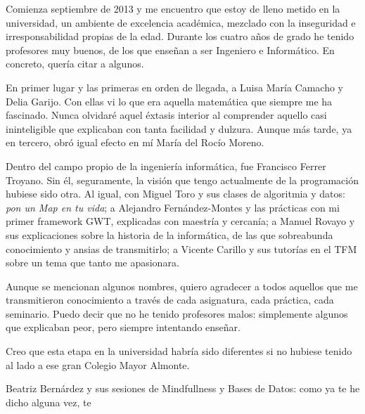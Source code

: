 Comienza septiembre de 2013 y me encuentro que estoy de lleno metido en la universidad, un ambiente de excelencia académica, mezclado con la inseguridad e irresponsabilidad propias de la edad. Durante los cuatro años de grado he tenido profesores muy buenos, de los que enseñan a ser Ingeniero e Informático. En concreto, quería citar a algunos.

En primer lugar y las primeras en orden de llegada, a Luisa María Camacho y Delia Garijo. Con ellas vi lo que era aquella matemática que siempre me ha fascinado. Nunca olvidaré aquel éxtasis interior al comprender aquello casi ininteligible que explicaban con tanta facilidad y dulzura. Aunque más tarde, ya en tercero, obró igual efecto en mí María del Rocío Moreno.

Dentro del campo propio de la ingeniería informática, fue Francisco Ferrer Troyano. Sin él, seguramente, la visión que tengo actualmente de la programación hubiese sido otra. Al igual, con Miguel Toro y sus clases de algoritmia y datos: \textit{pon un Map en tu vida}; a Alejandro Fernández-Montes y las prácticas con mi primer framework GWT, explicadas con maestría y cercanía; a Manuel Rovayo y sus explicaciones sobre la historia de la informática, de las que sobreabunda conocimiento y ansias de transmitirlo; a Vicente Carillo y sus tutorías en el TFM sobre un tema que tanto me apasionara.

Aunque se mencionan algunos nombres, quiero agradecer a todos aquellos que me transmitieron conocimiento a través de cada asignatura, cada práctica, cada seminario. Puedo decir que no he tenido profesores malos: simplemente algunos que explicaban peor, pero siempre intentando enseñar.

Creo que esta etapa en la universidad habría sido diferentes si no hubiese tenido al lado a ese gran Colegio Mayor Almonte.

Beatriz Bernárdez y sus sesiones de Mindfullness y Bases de Datos: como ya te he dicho alguna vez, te 

